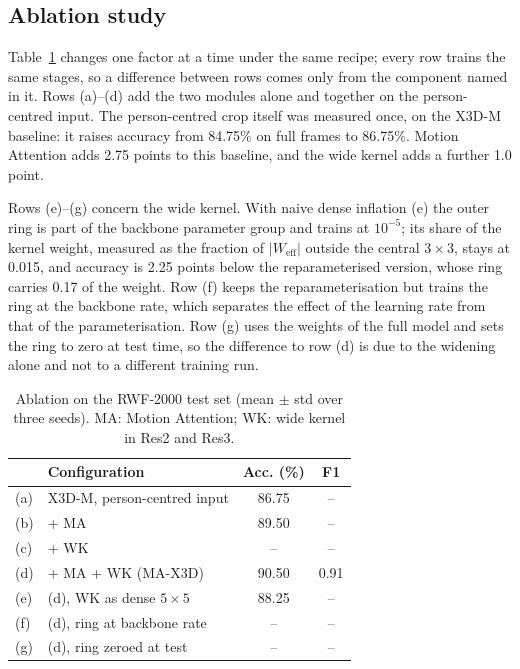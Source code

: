 \documentclass[conference]{IEEEtran}
\newif\ifdraft \drafttrue
\newcommand{\res}[1]{\ifdraft{\color{red}#1}\else#1\fi}
\begin{document}
\subsection{Ablation study}

Table~\ref{tab:ablation} changes one factor at a time under the same
recipe; every row trains the same stages, so a difference between rows
comes only from the component named in it. Rows (a)--(d) add the two
modules alone and together on the person-centred input. The
person-centred crop itself was measured once, on the X3D-M baseline: it
raises accuracy from \res{84.75\%} on full frames to \res{86.75\%}.
Motion Attention adds \res{2.75} points to this baseline, and the wide
kernel adds a further \res{1.0} point.

Rows (e)--(g) concern the wide kernel. With naive dense inflation (e)
the outer ring is part of the backbone parameter group and trains at
$10^{-5}$; its share of the kernel weight, measured as the fraction of
$|W_{\text{eff}}|$ outside the central $3 \times 3$, stays at
\res{0.015}, and accuracy is \res{2.25} points below the
reparameterised version, whose ring carries \res{0.17} of the weight.
Row (f) keeps the reparameterisation but trains the ring at the
backbone rate, which separates the effect of the learning rate from that
of the parameterisation. Row (g) uses the weights of the full model and
sets the ring to zero at test time, so the difference to row (d) is due
to the widening alone and not to a different training run.

\begin{table}[t]
  \caption{Ablation on the RWF-2000 test set (mean $\pm$ std over three
  seeds). MA: Motion Attention; WK: wide kernel in Res2 and Res3.}
  \label{tab:ablation}
  \centering
  \small
  \setlength{\tabcolsep}{4pt}
  \begin{tabular}{llcc}
    \toprule
    & Configuration & Acc. (\%) & F1 \\
    \midrule
    (a) & X3D-M, person-centred input & \res{86.75} & \res{--} \\
    (b) & + MA                        & \res{89.50} & \res{--} \\
    (c) & + WK                        & \res{--}    & \res{--} \\
    (d) & + MA + WK (MA-X3D)          & \res{90.50} & \res{0.91} \\
    \midrule
    (e) & (d), WK as dense $5\times5$ & \res{88.25} & \res{--} \\
    (f) & (d), ring at backbone rate  & \res{--}    & \res{--} \\
    (g) & (d), ring zeroed at test    & \res{--}    & \res{--} \\
    \bottomrule
  \end{tabular}
\end{table}
\end{document}
